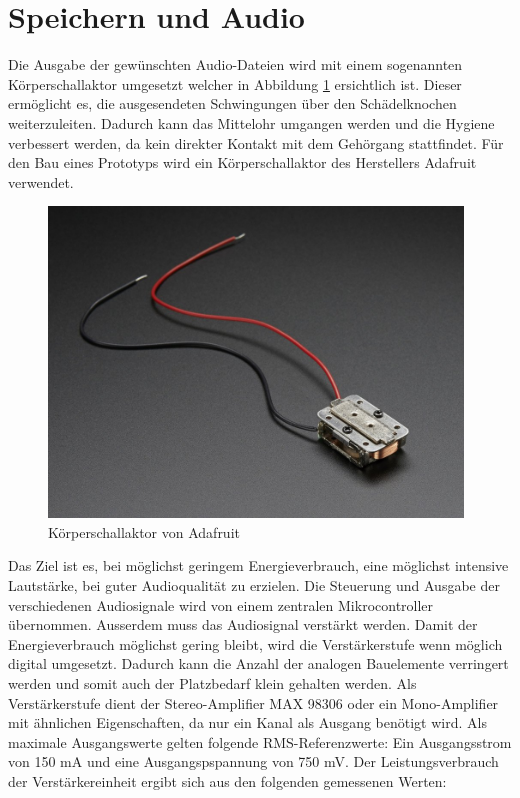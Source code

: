 \section{Speichern und Audio}

Die Ausgabe der gewünschten Audio-Dateien wird mit einem sogenannten Körperschallaktor umgesetzt welcher in Abbildung \ref*{fig:schallaktorAdafruit} ersichtlich ist. Dieser ermöglicht es, die ausgesendeten Schwingungen über den Schädelknochen weiterzuleiten. Dadurch kann das Mittelohr umgangen werden und die Hygiene verbessert werden, da kein direkter Kontakt mit dem Gehörgang stattfindet. Für den Bau eines Prototyps wird ein Körperschallaktor des Herstellers Adafruit verwendet. 

\begin{figure}[H]
\begin{center}
	\includegraphics[width=110mm]{data/Schallaktor.png}
	\caption{Körperschallaktor von Adafruit}
	\label{fig:schallaktorAdafruit}
\end{center}
\end{figure}

Das Ziel ist es, bei möglichst geringem Energieverbrauch, eine möglichst intensive Lautstärke, bei guter Audioqualität zu erzielen.
Die Steuerung und Ausgabe der verschiedenen Audiosignale wird von einem zentralen Mikrocontroller übernommen. Ausserdem muss das Audiosignal verstärkt werden. Damit der Energieverbrauch möglichst gering bleibt, wird die Verstärkerstufe wenn möglich digital umgesetzt. Dadurch kann die Anzahl der analogen Bauelemente verringert werden und somit auch der Platzbedarf klein gehalten werden. Als Verstärkerstufe dient der Stereo-Amplifier MAX 98306 oder ein Mono-Amplifier mit ähnlichen Eigenschaften, da nur ein Kanal als Ausgang benötigt wird. Als maximale Ausgangswerte gelten folgende RMS-Referenzwerte: Ein Ausgangsstrom von 150 mA und eine Ausgangspspannung von 750 mV.
Der Leistungsverbrauch der Verstärkereinheit ergibt sich aus den folgenden gemessenen Werten:

